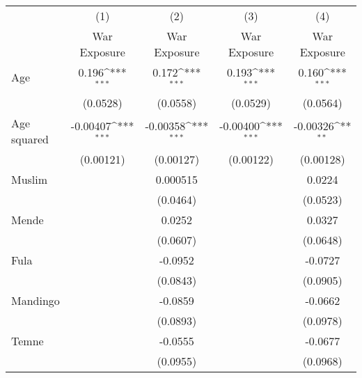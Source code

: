 {
\def\sym#1{\ifmmode^{#1}\else\(^{#1}\)\fi}
\begin{tabular}{l*{4}{c}}
\hline\hline
                    &\multicolumn{1}{c}{(1)}&\multicolumn{1}{c}{(2)}&\multicolumn{1}{c}{(3)}&\multicolumn{1}{c}{(4)}\\
                    &\multicolumn{1}{c}{War Exposure}&\multicolumn{1}{c}{War Exposure}&\multicolumn{1}{c}{War Exposure}&\multicolumn{1}{c}{War Exposure}\\
\hline
Age                 &       0.196\sym{***}&       0.172\sym{***}&       0.193\sym{***}&       0.160\sym{***}\\
                    &    (0.0528)         &    (0.0558)         &    (0.0529)         &    (0.0564)         \\
[1em]
Age squared         &    -0.00407\sym{***}&    -0.00358\sym{***}&    -0.00400\sym{***}&    -0.00326\sym{**} \\
                    &   (0.00121)         &   (0.00127)         &   (0.00122)         &   (0.00128)         \\
[1em]
Muslim              &                     &    0.000515         &                     &      0.0224         \\
                    &                     &    (0.0464)         &                     &    (0.0523)         \\
[1em]
Mende               &                     &      0.0252         &                     &      0.0327         \\
                    &                     &    (0.0607)         &                     &    (0.0648)         \\
[1em]
Fula                &                     &     -0.0952         &                     &     -0.0727         \\
                    &                     &    (0.0843)         &                     &    (0.0905)         \\
[1em]
Mandingo            &                     &     -0.0859         &                     &     -0.0662         \\
                    &                     &    (0.0893)         &                     &    (0.0978)         \\
[1em]
Temne               &                     &     -0.0555         &                     &     -0.0677         \\
                    &                     &    (0.0955)         &                     &    (0.0968)         \\

\end{tabular}}
